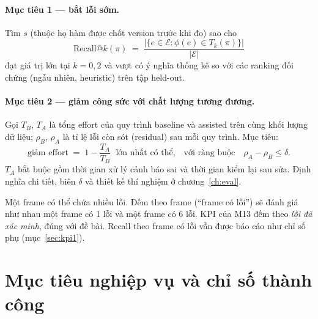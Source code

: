 \paragraph{Mục tiêu 1 — bắt lỗi sớm.}
Tìm \(s\) (thuộc họ hàm được chốt version trước khi đo) sao cho
\begin{equation}
  \mathrm{Recall@}k(\pi) \;=\;
  \frac{\bigl|\{e \in \mathcal{E} : \phi(e) \in T_k(\pi)\}\bigr|}{|\mathcal{E}|}
  \label{eq:recallk}
\end{equation}
đạt giá trị lớn tại \(k = 0{,}2\) và vượt có ý nghĩa thống kê so với các ranking
đối chứng (ngẫu nhiên, heuristic) trên tập held-out.

\paragraph{Mục tiêu 2 — giảm công sức với chất lượng tương đương.}
Gọi \(T_B\), \(T_A\) là tổng effort của quy trình baseline và assisted trên cùng
khối lượng dữ liệu; \(\rho_B\), \(\rho_A\) là tỉ lệ lỗi còn sót (residual) sau
mỗi quy trình. Mục tiêu:
\begin{equation}
  \text{giảm effort} \;=\; 1 - \frac{T_A}{T_B} \;\text{ lớn nhất có thể,}
  \quad\text{với ràng buộc}\quad \rho_A - \rho_B \le \delta .
  \label{eq:effort}
\end{equation}
\(T_A\) bắt buộc gồm thời gian xử lý cảnh báo sai và thời gian kiểm lại sau sửa.
Định nghĩa chi tiết, biên \(\delta\) và thiết kế thí nghiệm ở chương~\ref{ch:eval}.

\begin{notebox}
Một frame có thể chứa nhiều lỗi. Đếm theo frame (``frame có lỗi'') sẽ đánh giá
như nhau một frame có 1 lỗi và một frame có 6 lỗi. KPI của M13 đếm theo
\emph{lỗi đã xác minh}, đúng với đề bài. Recall theo frame có lỗi vẫn được báo
cáo như chỉ số phụ (mục~\ref{sec:kpi1}).
\end{notebox}

\section{Mục tiêu nghiệp vụ và chỉ số thành công}
\label{sec:kpis}

